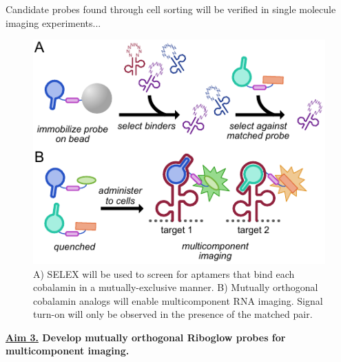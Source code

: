 Candidate probes found through cell sorting will be verified in single molecule imaging experiments...


\begin{figure}
\begin{centering}
\includegraphics[width=\textwidth]{figures/aim3.pdf}
\end{centering}
\footnotesize
\caption{\label{figure:aim3}
A) SELEX will be used to screen for aptamers that bind each cobalamin in a mutually-exclusive manner. B) Mutually orthogonal cobalamin analogs will enable multicomponent RNA imaging. Signal turn-on will only be observed in the presence of the matched pair.
}
\end{figure}

\textbf{\underline{Aim 3.} Develop mutually orthogonal Riboglow probes for multicomponent imaging.}\\

